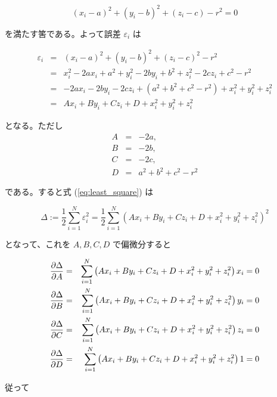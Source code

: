 \documentclass[12pt]{jsarticle}
\def\error{\varepsilon}
\def\sumdata{\sum_{i=1}^{N}}
\begin{document}
\begin{equation}
  (x_i - a)^2 + (y_i - b)^2 + (z_i - c) - r^2 = 0
\end{equation}

を満たす筈である。よって誤差 $\error_i$ は

\begin{eqnarray}
  \error_i &=& (x_i - a)^2 + (y_i - b)^2 + (z_i - c)^2 - r^2 \nonumber \\
  &=& x_i^2 - 2 a x_i + a^2  + y_i^2 - 2 b y_i + b^2
  + z_i^2 - 2 c z_i + c^2  - r^2 \nonumber \\
  &=& - 2 a x_i - 2 b y_i - 2 c z_i
  + (a^2 + b^2 + c^2 - r^2) + x_i^2 + y_i^2 +z_i^2 \nonumber \\
  &=& A x_i + B y_i + C z_i + D + x_i^2 + y_i^2 + z_i^2
\end{eqnarray}

となる。ただし
\begin{eqnarray}
  A &=& -2a, \nonumber \\
  B &=& -2b, \nonumber \\
  C &=& -2c, \nonumber \\
  D &=& a^2 + b^2 + c^2 - r^2 \label{eq:lsm_ball_assign}
\end{eqnarray}

である。すると式 (\ref{eq:least_square}) は

\begin{equation}
  \Delta := \frac{1}{2} \sumdata \error_i^2
  = \frac{1}{2} \sumdata \left(
  A x_i + B y_i + C z_i + D + x_i^2 + y_i^2 + z_i^2
  \right)^2
\end{equation}

となって、これを $A, B, C, D$ で偏微分すると

\begin{eqnarray}
  \partd{\Delta}{A} &=&
  \sumdata \left(A x_i + B y_i + C z_i + D + x_i^2 + y_i^2 + z_i^2 \right)
  x_i = 0 \nonumber \\
  \partd{\Delta}{B} &=&
  \sumdata \left(A x_i + B y_i + C z_i + D + x_i^2 + y_i^2 + z_i^2 \right)
  y_i = 0 \nonumber \\
  \partd{\Delta}{C} &=&
  \sumdata \left(A x_i + B y_i + C z_i + D + x_i^2 + y_i^2 + z_i^2 \right)
  z_i = 0 \nonumber \\
  \partd{\Delta}{D} &=&
  \sumdata \left(A x_i + B y_i + C z_i + D + x_i^2 + y_i^2 + z_i^2 \right)
  1 = 0
\end{eqnarray}

従って
\end{document}
